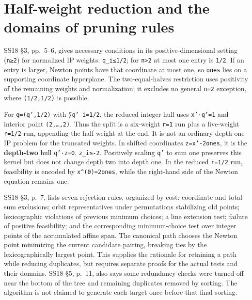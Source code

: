 \documentclass[11pt,a4paper,oneside]{report}
\begin{document}
\section{Half-weight reduction and the domains of pruning
rules}\label{weight-enumeration-and-degree-bounds--half-weight-reduction-and-the-domains-of-pruning-rules}

SS18 §3, pp.~5--6, gives necessary conditions in its
positive-dimensional setting (\texttt{n≥2}) for normalized IP weights:
\texttt{q\_\allowbreak{}i≤1/\allowbreak{}2}; for \texttt{n>2} at most
one entry is \texttt{1/\allowbreak{}2}. If an entry is larger, Newton
points have that coordinate at most one, so \texttt{ones} lies on a
supporting coordinate hyperplane. The two-equal-halves restriction uses
positivity of the remaining weights and normalization; it excludes no
general \texttt{n=\allowbreak{}2} exception, where
\texttt{(\allowbreak{}1/\allowbreak{}2,\allowbreak{}1/\allowbreak{}2)}
is possible.

For
\texttt{q=\allowbreak{}(\allowbreak{}q',\allowbreak{}1/\allowbreak{}2)}
with \texttt{∑q'\_\allowbreak{}i=\allowbreak{}1/\allowbreak{}2}, the
reduced integer hull uses \texttt{x'·q'=\allowbreak{}1} and interior
point \texttt{(\allowbreak{}2,\allowbreak{}…,\allowbreak{}2)}. Thus the
split is a six-weight \texttt{r=\allowbreak{}1} run plus a five-weight
\texttt{r=\allowbreak{}1/\allowbreak{}2} run, appending the half-weight
at the end. It is not an ordinary depth-one IP problem for the truncated
weights. In shifted coordinates
\texttt{z=\allowbreak{}x'-\allowbreak{}2ones}, it is the
\textbf{depth-two} hull \texttt{q'·z=\allowbreak{}0},
\texttt{z\_\allowbreak{}i≥-\allowbreak{}2}. Positively scaling
\texttt{q'} to sum one preserves this kernel but does not change depth
two into depth one. In the reduced
\texttt{r=\allowbreak{}1/\allowbreak{}2} run, feasibility is encoded by
\texttt{x\textasciicircum{}(\allowbreak{}0)\allowbreak{}=\allowbreak{}2ones},
while the right-hand side of the Newton equation remains one.

SS18 §3, p.~7, lists seven rejection rules, organized by cost:
coordinate and total-sum exclusions; orbit representatives under
permutations stabilizing old points; lexicographic violations of
previous minimum choices; a line extension test; failure of positive
feasibility; and the corresponding minimum-choice test over integer
points of the accumulated affine span. The canonical path chooses the
Newton point minimizing the current candidate pairing, breaking ties by
the lexicographically largest point. This supplies the rationale for
retaining a path while reducing duplicates, but requires separate proofs
for the actual tests and their domains. SS18 §5, p.~11, also says some
redundancy checks were turned off near the bottom of the tree and
remaining duplicates removed by sorting. The algorithm is not claimed to
generate each target once before that final sorting.
\end{document}
